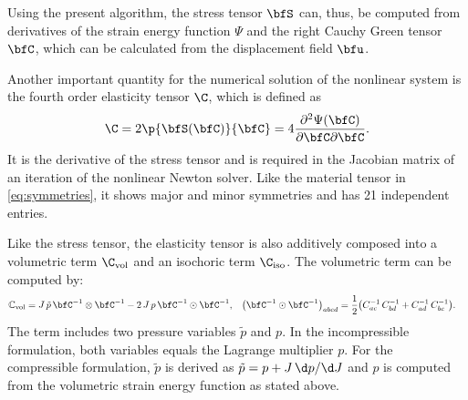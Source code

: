 Using the present algorithm, the stress tensor $\bfS$ can, thus, be computed from derivatives of the strain energy function $\Psi$ and the right Cauchy Green tensor $\bfC$, which can be calculated from the displacement field $\bfu$.

Another important quantity for the numerical solution of the nonlinear system is the fourth order elasticity tensor $\C$, which is defined as
\begin{align*}
  \C = 2\p{\bfS(\bfC)}{\bfC} = 4\dfrac{\partial^2 \Psi(\bfC)}{\partial\bfC\partial\bfC}.
\end{align*}
It is the derivative of the stress tensor and is required in the Jacobian matrix of an iteration of the nonlinear Newton solver. Like the material tensor in \cref{eq:symmetries}, it shows major and minor symmetries and has 21 independent entries.

Like the stress tensor, the elasticity tensor is also additively composed into a volumetric term $\C_\text{vol}$ and an isochoric term $\C_\text{iso}$. The volumetric term can be computed by:%
\begin{align*}
  \mathbb{C}_\text{vol} &= J\,\tilde{p}\,\bfC^{-1} \otimes \bfC^{-1} - 2\,J\,p\,\bfC^{-1} \odot \bfC^{-1}, &
  \big(\bfC^{-1} \odot \bfC^{-1}\big)_{abcd} &= \dfrac12\big(C^{-1}_{ac}\,C^{-1}_{bd} + C^{-1}_{ad}\,C^{-1}_{bc}\big).
\end{align*}
The term includes two pressure variables $\tilde{p}$ and $p$. In the incompressible formulation, both variables equals the Lagrange multiplier $p$. For the compressible formulation, $\tilde{p}$ is derived as $\tilde{p} = p + J\,\d p/\d J$ and $p$ is computed from the volumetric strain energy function as stated above.

